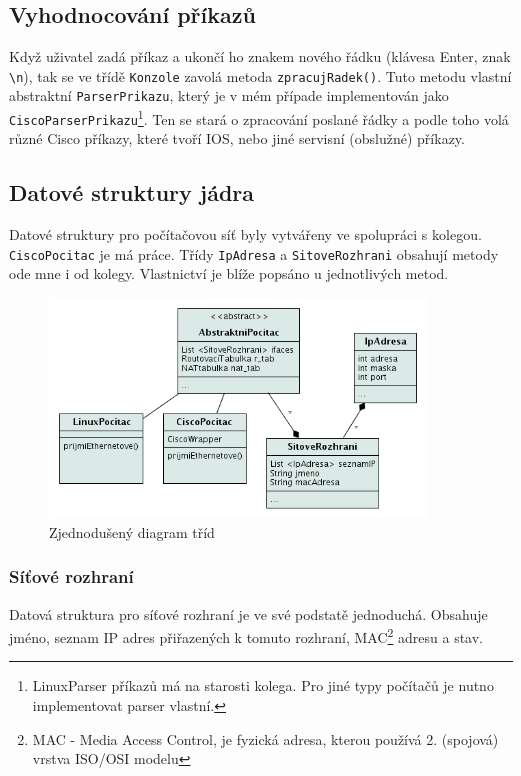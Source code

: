 \subsection{Vyhodnocování příkazů}
Když uživatel zadá příkaz a ukončí ho znakem nového řádku (klávesa Enter, znak \verb|\n|), tak se ve třídě \verb|Konzole| zavolá metoda \verb|zpracujRadek()|. Tuto metodu vlastní abstraktní \verb|ParserPrikazu|, který je v mém případe implementován jako \verb|CiscoParserPrikazu|\footnote{LinuxParser příkazů má na starosti kolega. Pro jiné typy počítačů je nutno implementovat parser vlastní.}. Ten se stará o zpracování poslané řádky a podle toho volá různé Cisco příkazy, které tvoří IOS, nebo jiné servisní (obslužné) příkazy.

\subsection{Datové struktury jádra}
Datové struktury pro počítačovou síť byly vytvářeny ve spolupráci s kolegou. \verb|CiscoPocitac| je má práce. Třídy \verb|IpAdresa| a \verb|SitoveRozhrani| obsahují metody ode mne i od kolegy. Vlastnictví je blíže popsáno u jednotlivých metod.

\begin{figure}[h]
\begin{center}
\includegraphics[width=10cm]{figures/uml_class}
\caption{Zjednodušený diagram tříd}
\label{uml:class}
\end{center}
\end{figure}


\subsubsection{Síťové rozhraní}
Datová struktura pro síťové rozhraní je ve své podstatě jednoduchá. Obsahuje jméno, seznam IP adres přiřazených k tomuto rozhraní, MAC\footnote{MAC - Media Access Control, je fyzická adresa, kterou používá 2. (spojová) vrstva ISO/OSI modelu} adresu a stav.

